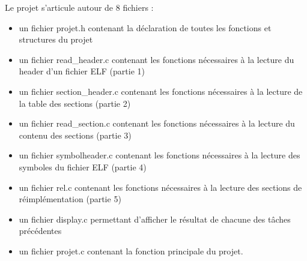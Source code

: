 \documentclass[12pt, a4paper]{article}
\begin{document}
Le projet s'articule autour de 8 fichiers : 

\begin{itemize}

\item un fichier projet.h contenant la déclaration de toutes les fonctions et structures du projet

\item un fichier read\_header.c contenant les fonctions nécessaires à la lecture du header d'un fichier ELF (partie 1)

\item un fichier section\_header.c contenant les fonctions nécessaires à la lecture de la table des sections (partie 2)

\item un fichier read\_section.c contenant les fonctions nécessaires à la lecture du contenu des sections (partie 3)

\item un fichier symbolheader.c contenant les fonctions nécessaires à la lecture des symboles du fichier ELF (partie 4)

\item un fichier rel.c contenant les fonctions nécessaires à la lecture des sections de réimplémentation (partie 5)

\item un fichier display.c permettant d'afficher le résultat de chacune des tâches précédentes

\item un fichier projet.c contenant la fonction principale du projet.
\end{itemize}
\end{document}
